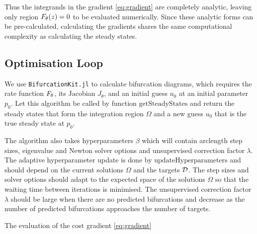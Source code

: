 Thus the integrands in the gradient \eqref{eq:gradient} are completely analytic, leaving only region $F_{\theta}(z)=0$ to be evaluated numerically. Since these analytic forms can be pre-calculated, calculating the gradients shares the same computational complexity as calculating the steady states. 

\subsection{Optimisation Loop}
We use \texttt{BifurcationKit.jl} \cite{Veltz2019PseudoArcLengthContinuation.jl} to calculate bifurcation diagrams, which requires the rate function $F_{\theta}$, its Jacobian $J_\theta$, and an initial guess $u_0$ at an initial parameter $p_0$. Let this algorithm be called by function $\mathrm{getSteadyStates}$ and return the steady states that form the integration region $\Omega$ and a new guess $u_0$ that is the true steady state at $p_0$.

The algorithm also takes hyperparameters $\beta$ which will contain arclength step sizes, eigenvalue and Newton solver options and unsupervised correction factor $\lambda$. The adaptive hyperparameter update is done by $\mathrm{updateHyperparameters}$ and should depend on the current solutions $\Omega$ and the targets $\mathcal{D}$. The step sizes and solver options should adapt to the expected space of the solutions $\Omega$ so that the waiting time between iterations is minimised. The unsupervised correction factor $\lambda$ should be large when there are no predicted bifurcations and decrease as the number of predicted bifurcations approaches the number of targets.

The evaluation of the cost gradient \eqref{eq:gradient}

